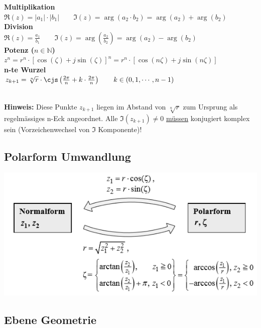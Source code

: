 \noindent\textbf{Multiplikation}\\
$\Re(z) = |a_1| \cdot |b_1| \qquad \Im(z) = \arg(a_2 \cdot b_2) = \arg(a_2) + \arg(b_2)$\\

\noindent\textbf{Division}\\
$\Re(z) = \frac{a_1}{b_1} \qquad \Im(z) = \arg(\frac{a_2}{b_2}) = \arg(a_2) - \arg(b_2)$\\

\noindent\textbf{Potenz ($n \in \mathbb{N}$)}\\
$z^n = r^n \cdot [\cos(\zeta) + j\sin(\zeta)]^n = r^n \cdot [\cos(n\zeta) + j\sin(n\zeta)]$\\

\noindent\textbf{n-te Wurzel}\\
$z_{k+1} = \sqrt[n]{r} \cdot \cjs\left(\frac{2\pi}{n} + k \cdot \frac{2\pi}{n}\right) \qquad k \in (0, 1, \cdots, n-1)$

~\\
\noindent\textbf{Hinweis:} Diese Punkte $z_{k+1}$ liegen im Abstand von $\sqrt[n]{r}$ zum Ursprung als regelmässiges n-Eck angeordnet. Alle $\Im(z_{k+1}) \neq 0$ \underline{müssen} konjugiert komplex sein (Vorzeichenwechsel von $\Im$ Komponente)!

\subsection{Polarform Umwandlung}
\begin{center}
	\includegraphics[width=0.7\columnwidth]{Images/umwandlung}
\end{center}

\subsection{Ebene Geometrie}
